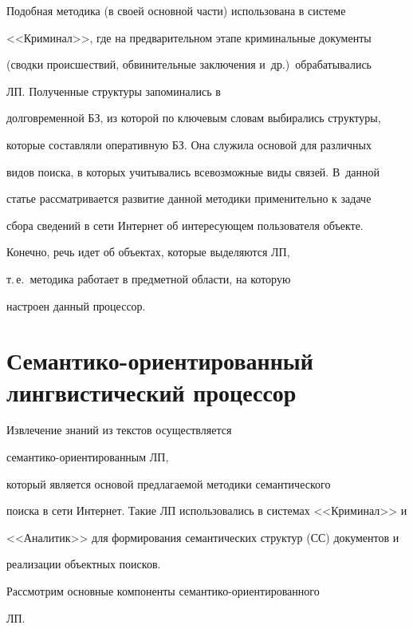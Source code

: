     Подобная методика (в своей основной части) использована в системе 


<<Криминал>>, где на предварительном этапе криминальные документы 


(сводки происшествий, обвинительные заключения и~др.)\ обрабатывались 


ЛП. Полученные структуры запоминались в 


долговременной БЗ, из которой по ключевым словам выбирались структуры, 


которые составляли оперативную БЗ. Она служила основой для различных 


видов поиска, в которых учитывались всевозможные виды связей. В~данной 


статье рассматривается развитие данной методики применительно к задаче 


сбора сведений в сети Интернет об интересующем пользователя объекте. 


Конечно, речь идет об объектах, которые выделяются ЛП, 


т.\,е.\ методика работает в предметной области, на которую 


настроен данный процессор. 


    


\section{Семантико-ориентированный лингвистический процессор}


    


    Извлечение знаний из текстов осуществляется 


    се\-ман\-ти\-ко-ориен\-ти\-ро\-ван\-ным ЛП, 


    который является основой предлагаемой методики семантического 


поиска в сети Интернет. Такие ЛП использовались в системах <<Криминал>> и 


<<Аналитик>> для формирования семантических структур (СС) документов и 


реализации объектных поисков. 


    


    Рассмотрим основные компоненты семантико-ориен\-ти\-ро\-ван\-но\-го 


ЛП.


    


